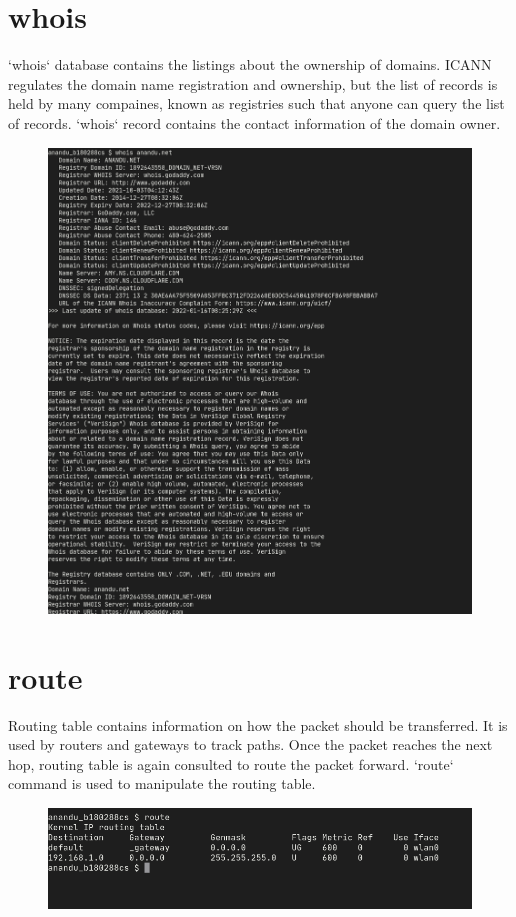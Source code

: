 \documentclass{article}
\begin{document}
\section{whois}
`whois` database contains the listings about the ownership of domains. ICANN regulates the domain name registration and ownership, but the list of records is held by many compaines, known as registries such that anyone can query the list of records. `whois` record contains the contact information of the domain owner.
\begin{figure}[ht]
    \centering
    \includegraphics[width=1.0\textwidth]{images/whois.png}
\end{figure}
\pagebreak

\section{route}
Routing table contains information on how the packet should be transferred. It is used by routers and gateways to track paths. Once the packet reaches the next hop, routing table is again consulted to route the packet forward. `route` command is used to manipulate the routing table.
\begin{figure}[ht]
    \centering
    \includegraphics[width=1.0\textwidth]{images/route.png}
\end{figure}
\pagebreak
\end{document}
